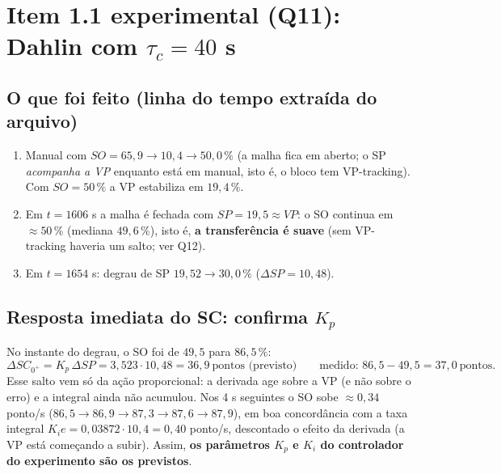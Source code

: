 \section{Item 1.1 experimental (Q11): Dahlin com $\tau_c=40$ s}\label{expq11}
\subsection{O que foi feito (linha do tempo extraída do arquivo)}
\begin{enumerate}
\item Manual com $SO=65{,}9\to10{,}4\to50{,}0\,\%$ (a malha fica em aberto; o SP \emph{acompanha a VP} enquanto está em manual, isto é, o bloco tem VP-tracking). Com $SO=50\,\%$ a VP estabiliza em $19{,}4\,\%$.
\item Em $t=1606$ s a malha é fechada com $SP=19{,}5\approx VP$: o SO continua em $\approx50\,\%$ (mediana $49{,}6\,\%$), isto é, \textbf{a transferência é suave} (sem VP-tracking haveria um salto; ver Q12).
\item Em $t=1654$ s: degrau de SP $19{,}52\to30{,}0\,\%$ ($\Delta SP=10{,}48$).
\end{enumerate}
\subsection{Resposta imediata do SC: confirma $K_p$}
No instante do degrau, o SO foi de $49{,}5$ para $86{,}5\,\%$:
\[
\Delta SC_{0^+}=K_p\,\Delta SP=3{,}523\cdot10{,}48=36{,}9\ \text{pontos (previsto)}\qquad\text{medido: }86{,}5-49{,}5=37{,}0\ \text{pontos.}
\]
Esse salto vem só da ação proporcional: a derivada age sobre a VP (e não sobre o erro) e a integral ainda não acumulou. Nos 4 s seguintes o SO sobe $\approx0{,}34$ ponto/s ($86{,}5\to86{,}9\to87{,}3\to87{,}6\to87{,}9$), em boa concordância com a taxa integral $K_ie=0{,}03872\cdot10{,}4=0{,}40$ ponto/s, descontado o efeito da derivada (a VP está começando a subir). Assim, \textbf{os parâmetros $K_p$ e $K_i$ do controlador do experimento são os previstos}.

